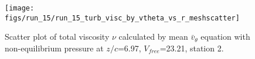 \begin{figure}[H]
\centering
\texttt{[image: figs/run\_15/run\_15\_turb\_visc\_by\_vtheta\_vs\_r\_meshscatter]}
\caption{Scatter plot of total viscosity $\nu$ calculated by mean $\bar{v}_{\theta}$ equation with non-equilibrium pressure at $z/c$=6.97, $V_{free}$=23.21, station 2.}
\label{fig:run_15_turb_visc_by_vtheta_vs_r_meshscatter}
\end{figure}


